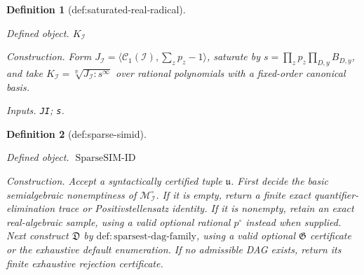 \documentclass{article}
\newtheorem{definition}{Definition}
\begin{document}
\begin{definition}[def:saturated-real-radical]\label{def:saturated-real-radical}
\par\smallskip\noindent\emph{Defined object.} \(K_{\mathcal I}\)
\par\smallskip\noindent\emph{Construction.} Form \(J_{\mathcal I}=\langle\mathcal C_1(\mathcal I),\sum_zp_z-1\rangle\), saturate by \(s=\prod_zp_z\prod_{D,y}B_{D,y}\), and take \(K_{\mathcal I}=\sqrt[\mathbb R]{J_{\mathcal I}:s^{\infty}}\) over rational polynomials with a fixed-order canonical basis.
\par\smallskip\noindent\emph{Inputs.} \texttt{JI}; \texttt{s}.
\end{definition}

\begin{definition}[def:sparse-simid]\label{def:sparse-simid}
\par\smallskip\noindent\emph{Defined object.} \(\operatorname{SparseSIM\text{-}ID}\)
\par\smallskip\noindent\emph{Construction.} Accept a syntactically certified tuple \(\mathfrak u\).  First decide the basic semialgebraic nonemptiness of \(\mathcal M_{\mathcal I}^{\circ}\).  If it is empty, return a finite exact quantifier-elimination trace or Positivstellensatz identity.  If it is nonempty, retain an exact real-algebraic sample, using a valid optional rational \(p^{\circ}\) instead when supplied.  Next construct \(\mathfrak D\) by \(\mathrm{def{:}sparsest\text{-}dag\text{-}family}\), using a valid optional \(\mathfrak G\) certificate or the exhaustive default enumeration.  If no admissible DAG exists, return its finite exhaustive rejection certificate.


\end{definition}
\end{document}
